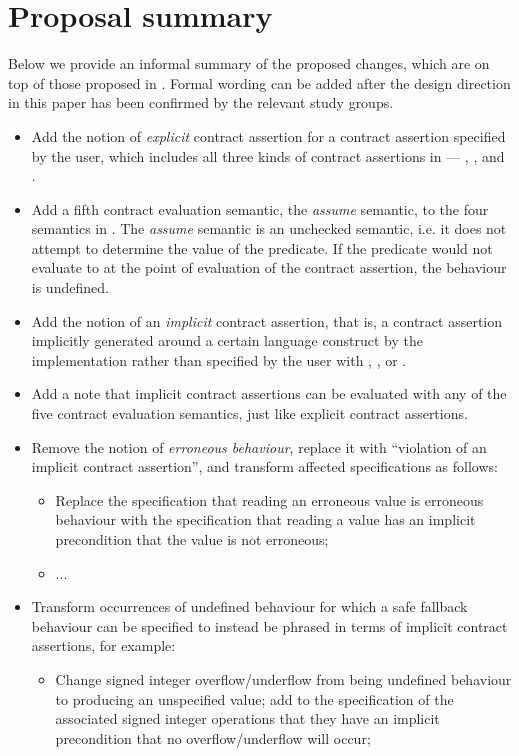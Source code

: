 \section{Proposal summary}
Below we provide an informal summary of the proposed changes, which are on top of those proposed in \cite{P2900R9}. Formal wording can be added after the design direction in this paper has been confirmed by the relevant study groups.

\begin{itemize}
\item Add the notion of \emph{explicit} contract assertion for a contract assertion specified by the user, which includes all three kinds of contract assertions in \cite{P2900R9} --- , , and .
\item Add a fifth contract evaluation semantic, the \emph{assume} semantic, to the four semantics in \cite{P2900R9}. The  \emph{assume} semantic is an unchecked semantic, i.e. it does not attempt to determine the value of the predicate. If the predicate would not evaluate to  at the point of evaluation of the contract assertion, the behaviour is undefined.
\item Add the notion of an \emph{implicit} contract assertion, that is, a contract assertion implicitly generated around a certain language construct by the implementation rather than specified by the user with , , or .
\item Add a note that implicit contract assertions can be evaluated with any of the five contract evaluation semantics, just like explicit contract assertions.
\item Remove the notion of \emph{erroneous behaviour}, replace it with ``violation of an implicit contract assertion'', and transform affected specifications as follows:
\begin{itemize}
\item Replace the specification that reading an erroneous value is erroneous behaviour with the specification that reading a value has an implicit precondition that the value is not erroneous;
\item ...
\end{itemize}
\item Transform occurrences of undefined behaviour for which a safe fallback behaviour can be specified to instead be phrased in terms of implicit contract assertions, for example:
\begin{itemize}
\item Change signed integer overflow/underflow from being undefined behaviour to producing an unspecified value; add to the specification of the associated signed integer operations that they have an implicit precondition that no overflow/underflow will occur;

\end{itemize}
\end{itemize}
